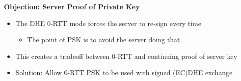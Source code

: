\documentclass[helvetica]{seminar}
\newcommand{\heading}[1]{%
  \begin{center} 
    \large\bf 
    #1 
  \end{center} 
  \vspace{.4 in}}
\begin{document}
\begin{slide}
\heading{Objection: Server Proof of Private Key}

\begin{itemize}
\item The DHE 0-RTT mode forces the server to re-sign every time
  \begin{itemize}
  \item The point of PSK is to avoid the server doing that
  \end{itemize}

\item This creates a tradeoff between 0-RTT and continuing proof of server key
\item Solution: Allow 0-RTT PSK to be used with signed (EC)DHE exchange
\end{itemize}

\end{slide}
\end{document}
